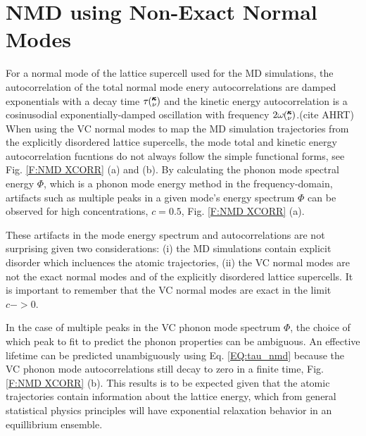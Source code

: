 \documentclass[aps,prb,onecolumn,preprint,superscriptaddress,amsmath,amssymb,floatfix]{revtex4}
\newcommand{\kv}{\mspace{-4.0mu}\left(\mspace{-8.0mu}
\begin{smallmatrix}&\pmb{\kappa} \\&\nu\end{smallmatrix}
\mspace{-3.0mu}\right)}
\begin{document}

\section{\label{A:NMD XCORR}
NMD using Non-Exact Normal Modes}

For a normal mode of the lattice supercell 
used for the MD simulations, 
the autocorrelation of the total 
normal mode enery autocorrelations are damped exponentials 
with a decay time $\tau\kv$ and the kinetic energy autocorrelation is a 
cosinusodial exponentially-damped oscillation with frequency 
$2\omega\kv$.(cite AHRT)   
When using the VC normal modes to map the MD simulation 
trajectories from the explicitly disordered lattice supercells, 
the mode total and kinetic energy autocorrelation fucntions 
do not always follow the simple functional forms, 
see Fig. \ref{F:NMD XCORR} (a) and (b). 
By calculating the phonon mode spectral 
energy $\Phi$, which is a phonon mode energy method in the  
frequency-domain,\cite{larkin_comparison_2012} artifacts such as 
multiple peaks in a given mode's 
energy spectrum $\Phi$ can be observed for high concentrations,  
$c=0.5$, Fig. \ref{F:NMD XCORR} (a).   

These artifacts in the mode energy spectrum and autocorrelations 
are not surprising 
given two considerations: 
(i) the MD simulations 
contain explicit disorder which incluences the atomic trajectories, 
(ii)
the VC normal modes are not the exact normal modes and of the 
explicitly disordered lattice supercells. 
It is important to remember that the VC normal modes 
are exact in the limit $c->0$. 

In the case 
of multiple peaks in the VC phonon mode spectrum $\Phi$, 
the choice of which peak to fit to predict the phonon 
properties can be ambiguous. An effective lifetime can be predicted 
unambiguously using Eq. \eqref{EQ:tau_nmd} 
because the VC phonon mode autocorrelations 
still decay to zero in a finite time, Fig. \ref{F:NMD XCORR} (b). 
This results is to be expected 
given that the atomic trajectories contain 
information about the lattice energy, which from general statistical 
physics principles will have exponential relaxation behavior in an 
equillibrium ensemble.
\cite{srivastava_physics_1990,landau_statistical_1980,
rajabpour_thermal_2010}
\end{document}
